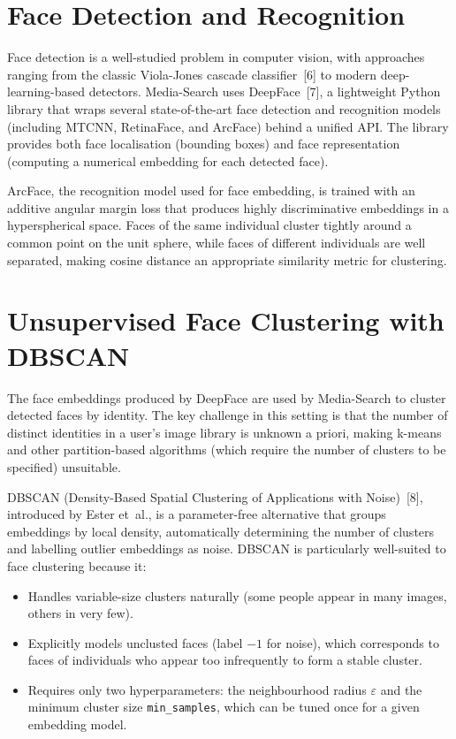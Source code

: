 \documentclass[12pt,a4paper,oneside]{report}
\begin{document}
\section{Face Detection and Recognition}
Face detection is a well-studied problem in computer vision, with approaches
ranging from the classic Viola-Jones cascade classifier~[6] to modern
deep-learning-based detectors. Media-Search uses DeepFace~[7], a lightweight
Python library that wraps several state-of-the-art face detection and
recognition models (including MTCNN, RetinaFace, and ArcFace) behind a unified
API. The library provides both face localisation (bounding boxes) and face
representation (computing a numerical embedding for each detected face).

ArcFace, the recognition model used for face embedding, is trained with an
additive angular margin loss that produces highly discriminative embeddings
in a hyperspherical space. Faces of the same individual cluster tightly
around a common point on the unit sphere, while faces of different individuals
are well separated, making cosine distance an appropriate similarity metric
for clustering.

\section{Unsupervised Face Clustering with DBSCAN}
The face embeddings produced by DeepFace are used by Media-Search to cluster
detected faces by identity. The key challenge in this setting is that the
number of distinct identities in a user's image library is unknown a priori,
making k-means and other partition-based algorithms (which require the number
of clusters to be specified) unsuitable.

DBSCAN (Density-Based Spatial Clustering of Applications with Noise)~[8],
introduced by Ester et~al., is a parameter-free alternative that groups
embeddings by local density, automatically determining the number of clusters
and labelling outlier embeddings as noise. DBSCAN is particularly
well-suited to face clustering because it:
\begin{itemize}[leftmargin=*]
  \item Handles variable-size clusters naturally (some people appear in
        many images, others in very few).
  \item Explicitly models unclusted faces (label $-1$ for noise), which
        corresponds to faces of individuals who appear too infrequently to
        form a stable cluster.
  \item Requires only two hyperparameters: the neighbourhood radius
        $\varepsilon$ and the minimum cluster size \texttt{min\_samples},
        which can be tuned once for a given embedding model.
\end{itemize}
\end{document}
